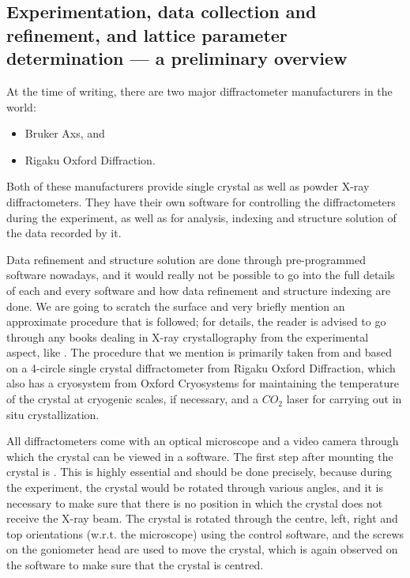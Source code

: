 \subsection{Experimentation, data collection and refinement, and lattice parameter determination --- a preliminary overview}

At the time of writing, there are two major diffractometer manufacturers in the world:%
%	
	\begin{itemize}%
%	
	    \item Bruker Axs, and
	    
	    \item Rigaku Oxford Diffraction.
	    
	\end{itemize}
	
Both of these manufacturers provide single crystal as well as powder X-ray diffractometers. They have their own software for controlling the diffractometers during the experiment, as well as for analysis, indexing and structure solution of the data recorded by it.

Data refinement and structure solution are done through pre-programmed software nowadays, and it would really not be possible to go into the full details of each and every software and how data refinement and structure indexing are done. We are going to scratch the surface and very briefly mention an approximate procedure that is followed; for details, the reader is advised to go through any books dealing in X-ray crystallography from the experimental aspect, like \cite{Cullity2014}. The procedure that we mention is primarily taken from \cite{Chowdhury2022} and based on a 4-circle single crystal diffractometer from Rigaku Oxford Diffraction, which also has a cryosystem from Oxford Cryosystems for maintaining the temperature of the crystal at cryogenic scales, if necessary, and a $CO_2$ laser for carrying out in situ crystallization.

All diffractometers come with an optical microscope and a video camera through which the crystal can be viewed in a software. The first step after mounting the crystal is . This is highly essential and should be done precisely, because during the experiment, the crystal would be rotated through various angles, and it is necessary to make sure that there is no position in which the crystal does not receive the X-ray beam. The crystal is rotated through the centre, left, right and top orientations (w.r.t. the microscope) using the control software, and the screws on the goniometer head are used to move the crystal, which is again observed on the software to make sure that the crystal is centred.

